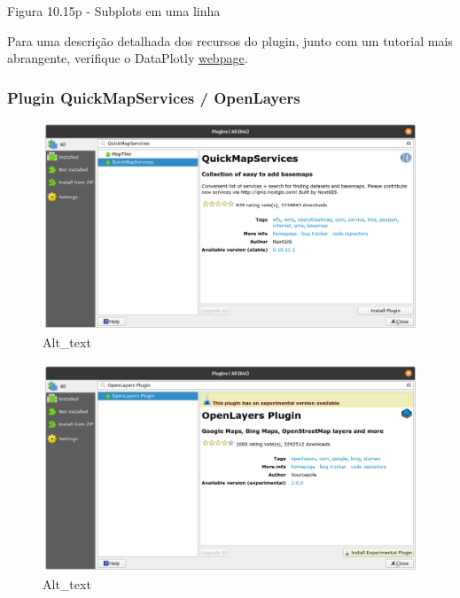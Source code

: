 \documentclass[
]{book}
\begin{document}
Figura 10.15p - Subplots em uma linha

Para uma descrição detalhada dos recursos do plugin, junto com um tutorial mais abrangente, verifique o DataPlotly \href{https:\%20//\%20github\%20.com\%20/\%20ghtmtt\%20/\%20DataPlotly}{webpage}.

\hypertarget{plugin-quickmapservices-openlayers}{%
\subsubsection{\texorpdfstring{\textbf{Plugin QuickMapServices / OpenLayers}}{Plugin QuickMapServices / OpenLayers}}\label{plugin-quickmapservices-openlayers}}

\begin{figure}
\centering
\includegraphics{media/modulo10/fig1016_a1.png}
\caption{Alt\_text}
\end{figure}

\begin{figure}
\centering
\includegraphics{media/modulo10/fig1016_a2.png}
\caption{Alt\_text}
\end{figure}
\end{document}
